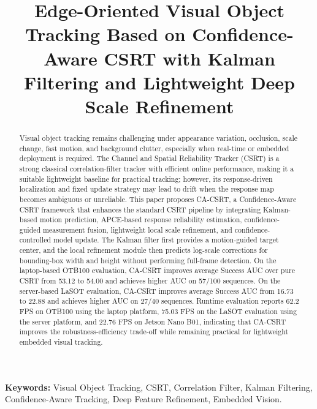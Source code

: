 \documentclass[10pt,a4paper]{article}
\title{Edge-Oriented Visual Object Tracking Based on Confidence-Aware CSRT with Kalman Filtering and Lightweight Deep Scale Refinement}
\date{}
\begin{document}
\maketitle

{\small
\begin{abstract}
Visual object tracking remains challenging under appearance variation, occlusion, scale change, fast motion, and background clutter, especially when real-time or embedded deployment is required. The Channel and Spatial Reliability Tracker (CSRT) is a strong classical correlation-filter tracker with efficient online performance, making it a suitable lightweight baseline for practical tracking; however, its response-driven localization and fixed update strategy may lead to drift when the response map becomes ambiguous or unreliable. This paper proposes CA-CSRT, a Confidence-Aware CSRT framework that enhances the standard CSRT pipeline by integrating Kalman-based motion prediction, APCE-based response reliability estimation, confidence-guided measurement fusion, lightweight local scale refinement, and confidence-controlled model update. The Kalman filter first provides a motion-guided target center, and the local refinement module then predicts log-scale corrections for bounding-box width and height without performing full-frame detection. On the laptop-based OTB100 evaluation, CA-CSRT improves average Success AUC over pure CSRT from 53.12 to 54.00 and achieves higher AUC on 57/100 sequences. On the server-based LaSOT evaluation, CA-CSRT improves average Success AUC from 16.73 to 22.88 and achieves higher AUC on 27/40 sequences. Runtime evaluation reports 62.2 FPS on OTB100 using the laptop platform, 75.03 FPS on the LaSOT evaluation using the server platform, and 22.76 FPS on Jetson Nano B01, indicating that CA-CSRT improves the robustness-efficiency trade-off while remaining practical for lightweight embedded visual tracking.
\end{abstract}

\noindent\textbf{Keywords:} Visual Object Tracking, CSRT, Correlation Filter, Kalman Filtering, Confidence-Aware Tracking, Deep Feature Refinement, Embedded Vision.
}

\vspace{0.3cm}
\end{document}
